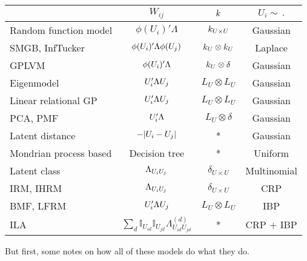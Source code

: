 \begin{table}
      \begin{tabular}{l|ccc}
      & $W_{ij}$ & $k$ & $U_i \sim \, .$ \\%
      \midrule
      Random function model & $\phi(U_i)'\Lambda$ & $k_{U\times U}$ & Gaussian\\%
      SMGB, InfTucker & $\phi(U_i)'\Lambda\phi(U_j)$ & $k_U \otimes k_U$ & Laplace \\%
      GPLVM & $\phi(U_i)'\Lambda$ & $k_U \otimes \delta$ & Gaussian \\%
      Eigenmodel & $U_i'\Lambda U_j$ & $L_U \otimes L_U$ & Gaussian \\%
      Linear relational GP & $U_i'\Lambda U_j$ & $L_U \otimes L_U$ & Gaussian \\%
      PCA, PMF & $U_i'\Lambda$ & $L_U \otimes \delta$ & Gaussian \\%
      Latent distance & $-|U_i - U_j|$ & * & Gaussian \\%
      Mondrian process based & Decision tree & * & Uniform \\%
      \midrule
      Latent class & $\Lambda_{U_iU_j}$ & $\delta_{U\times U}$ & Multinomial \\%
      IRM, IHRM &$\Lambda_{U_iU_j}$ & $\delta_{U\times U}$ & CRP \\%
      BMF, LFRM  & $U_i'\Lambda U_j$ & $L_U \otimes L_U$ & IBP \\%
      ILA & $\sum_d \mathbb{I}_{U_{id}}\mathbb{I}_{U_{jd}}\Lambda^{(d)}_{U_{id}U_{jd}}$ & * & CRP $+$ IBP \\%
    \end{tabular}
\end{table}

But first, some notes on how all of these models do what they do.

